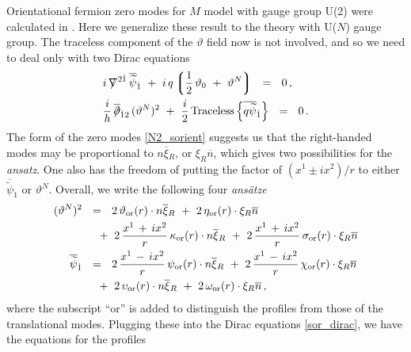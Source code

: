 \documentclass[12pt]{article}
\def\Tr{{\rm Tr}}
\newcommand{\p}{\partial}
\newcommand{\wt}{\widetilde}
\newcommand{\ov}{\overline}
\newcommand{\lgr}{\left\lgroup}
\newcommand{\rgr}{\right\rgroup}
\def\slashed#1{\setbox0=\hbox{$#1$}             %
   \dimen0=\wd0                                 %
   \setbox1=\hbox{/} \dimen1=\wd1               %
   \ifdim\dimen0>\dimen1                        %
      \rlap{\hbox to \dimen0{\hfil/\hfil}}      %
      #1                                        %
   \else                                        %
      \rlap{\hbox to \dimen1{\hfil$#1$\hfil}}   %
      /                                         %
   \fi}                                        %
\newcommand{\bxir}{\ov{\xi}{}_R}
\newcommand{\xir}{\xi_R}
\newcommand{\nbar}{\ov{n}}
\newcommand{\tor}{\vartheta_{\rm or}}
\newcommand{\eor}{\eta_{\rm or}}
\newcommand{\kor}{\kappa_{\rm or}}
\newcommand{\sor}{\sigma_{\rm or}}
\newcommand{\por}{\psi_{\rm or}}
\newcommand{\cor}{\chi_{\rm or}}
\newcommand{\uor}{\upsilon_{\rm or}}
\newcommand{\oor}{\omega_{\rm or}}
\begin{document}
Orientational fermion zero modes for $M$ model with gauge group U(2) were calculated in
\cite{GSYmmodel}. Here we generalize these result to the theory with U($N$) gauge group.	
The traceless component of the $ \vartheta $ field now is not involved, and so we
	need to deal only with two Dirac equations
\begin{align}
\label{sor_dirac}
%
&
\notag
	i\, \slashed{\nabla}^{2\dot{1}}\, \ov{\wt\psi}{}_{\dot 1}  
		~+~  i\, q \lgr \frac{1}{2}\, \vartheta_0  ~+~ \vartheta^N \rgr ~~=~~ 0\,, \\
%
&
	\frac{i}{h}\, \ov{\slashed{\p}}{}_{\dot{1}2}\, (\vartheta^N)^2
		~+~ \frac{i}{2}\, {\rm Traceless} \left\{ \ov{q \wt{\psi}}{}_{\dot 1} \right\} ~~=~~ 0\,.
\end{align}
	The form of the zero modes \eqref{N2_sorient} suggests us that the right-handed modes may be proportional
	to $ n\bxir $, or $ \xir\nbar $, which gives two possibilities for the {\it ansatz}.
	One also has the freedom of putting the factor of $ (x^1 \pm ix^2)/r $ to either 
	$ \ov{\wt \psi}{}_{\dot 1} $ or  $ \vartheta^N $.
	Overall, we write the following four {\it ans\"atze}
%
\begin{align*}
%
	(\vartheta^N)^2  & ~~=~~ 2\,\tor(r)\cdot n\bxir ~+~  2\,\eor(r) \cdot \xir \nbar \\
			& \quad
			~+~ 2\,\frac{x^1\,+\,ix^2}{r}\, \kor(r) \cdot n\bxir 
			~+~ 2\,\frac{x^1\,+\,ix^2}{r}\, \sor(r) \cdot \xir\nbar \\
%	
	\ov{\wt{\psi}}{}_{\dot 1} & ~~=~~ 2\, \frac{x^1\,-\,ix^2}{r}\, \por(r)\cdot n\bxir 
				      ~+~ 2\, \frac{x^1\,-\,ix^2}{r}\, \cor(r)\cdot \xir\nbar \\
				& \quad
				          ~+~ 2\, \uor(r)\cdot n\bxir
					  ~+~ 2\, \oor(r)\cdot \xir\nbar\,,
\end{align*}
	where the subscript ``or'' is added to distinguish the profiles from those of the translational modes. 
	Plugging these into the Dirac equations \eqref{sor_dirac}, we have the equations for the profiles
\end{document}
